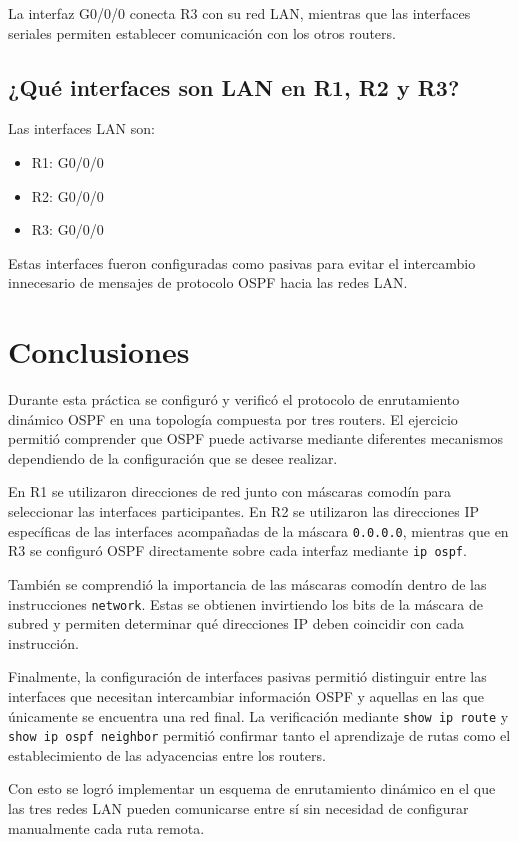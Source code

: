\documentclass[12pt,a4paper]{article}
\begin{document}
La interfaz G0/0/0 conecta R3 con su red LAN, mientras que las
interfaces seriales permiten establecer comunicación con los otros
routers.

\subsection{¿Qué interfaces son LAN en R1, R2 y R3?}

Las interfaces LAN son:

\begin{itemize}
    \item R1: G0/0/0
    \item R2: G0/0/0
    \item R3: G0/0/0
\end{itemize}

Estas interfaces fueron configuradas como pasivas para evitar el
intercambio innecesario de mensajes de protocolo OSPF hacia las redes
LAN.

\section{Conclusiones}

Durante esta práctica se configuró y verificó el protocolo de
enrutamiento dinámico OSPF en una topología compuesta por tres
routers. El ejercicio permitió comprender que OSPF puede activarse
mediante diferentes mecanismos dependiendo de la configuración que se
desee realizar.

En R1 se utilizaron direcciones de red junto con máscaras comodín para
seleccionar las interfaces participantes. En R2 se utilizaron las
direcciones IP específicas de las interfaces acompañadas de la
máscara \texttt{0.0.0.0}, mientras que en R3 se configuró OSPF
directamente sobre cada interfaz mediante \texttt{ip ospf}.

También se comprendió la importancia de las máscaras comodín dentro de
las instrucciones \texttt{network}. Estas se obtienen invirtiendo los
bits de la máscara de subred y permiten determinar qué direcciones IP
deben coincidir con cada instrucción.

Finalmente, la configuración de interfaces pasivas permitió distinguir
entre las interfaces que necesitan intercambiar información OSPF y
aquellas en las que únicamente se encuentra una red final. La
verificación mediante \texttt{show ip route} y
\texttt{show ip ospf neighbor} permitió confirmar tanto el aprendizaje
de rutas como el establecimiento de las adyacencias entre los routers.

Con esto se logró implementar un esquema de enrutamiento dinámico en
el que las tres redes LAN pueden comunicarse entre sí sin necesidad de
configurar manualmente cada ruta remota.
\end{document}
